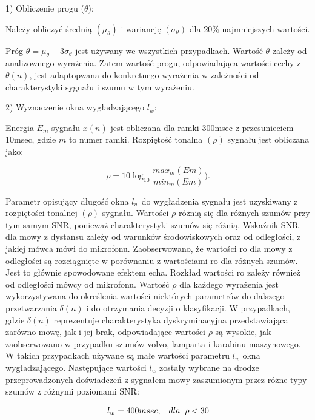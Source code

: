 \documentclass[eng,printmode]{mgr}
\begin{document}
  1) Obliczenie progu ($\theta$):
  
  Należy obliczyć średnią $(\mu_{\theta})$ i wariancję $(\sigma_{\theta})$ dla 20\% najmniejszych wartości.
  
  Próg $\theta = \mu_{\theta} + 3\sigma_{\theta}$ jest używany we wszystkich przypadkach. Wartość $\theta$ zależy od analizownego wyrażenia. Zatem wartość progu, odpowiadająca wartości cechy z $\theta(n)$, jest adaptopwana do konkretnego wyrażenia w zależności od charakterystyki sygnału i szumu w tym wyrażeniu.\vspace{5mm}
  
  2) Wyznaczenie okna wygładzającego $l_{w}$:
  
  Energia $E_{m}$ sygnału $x(n)$ jest obliczana dla ramki 300msec z przesunieciem 10msec, gdzie $m$ to numer ramki. Rozpiętość tonalna $(\rho)$ sygnału jest obliczana jako:
  
  \begin{equation}
	  \rho = 10\log_{10}\frac{max_m(Em)}{min_m(Em)}).
  \end{equation}
  
  
  Parametr opisujący długość okna $l_{w}$ do wygładzenia sygnału jest uzyskiwany z rozpiętości tonalnej $(\rho)$ sygnału.  Wartości $\rho$ różnią się dla różnych szumów przy tym samym SNR, ponieważ charakterystyki szumów się różnią. Wskaźnik SNR dla mowy z dystansu zależy od warunków środowiskowych oraz od odległości, z jakiej mówca mówi do mikrofonu.  Zaobserwowano, że wartości ro dla mowy z odległości są rozciągnięte w porównaniu z wartościami ro dla różnych szumów. Jest to głównie spowodowane efektem echa. Rozkład wartości ro zależy również od odległości mówcy od mikrofonu. Wartość $\rho$ dla każdego wyrażenia jest wykorzystywana do określenia wartości niektórych parametrów do dalszego przetwarzania $\delta(n)$ i do otrzymania decyzji o klasyfikacji. W przypadkach, gdzie $\delta(n)$ reprezentuje charakterystyka dyskryminacyjna przedstawiająca zarówno mowę, jak i jej brak, odpowiadające wartości $\rho$ są wysokie, jak zaobserwowano w przypadku szumów volvo, lamparta i karabinu maszynowego. W takich przypadkach używane są małe wartości parametru $l_{w}$ okna wygładzającego. Następujące wartości $l_{w}$ zostały wybrane na drodze przeprowadzonych doświadczeń z sygnałem mowy zaszumionym przez różne typy szumów z różnymi poziomami SNR:
  
  $$l_{w} = 400msec,\hspace{3mm}dla\hspace{2mm} \rho<30 $$
  
\end{document}
